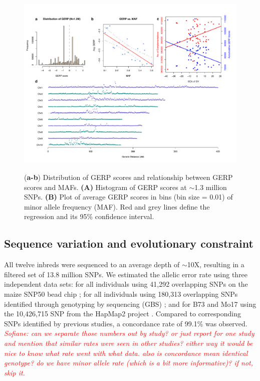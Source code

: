 \documentclass[twoside,twocolumn, letterpaper]{article}
\renewcommand{\baselinestretch}{1}
\newcommand{\jri}[1]{\textcolor{red}{ \emph{ #1}} }
\begin{document}
\begin{figure}[tbh]   
  \begin{center}
   \vspace{-2mm}
   \includegraphics[width=0.8\linewidth]{Fig2_gerp.pdf}
   \renewcommand{\baselinestretch}{0.9}
   \vspace{-3mm}
   \caption{({\bfseries a-b}) Distribution of GERP scores and relationship between GERP scores and MAFs. \textbf{(A)} Histogram of GERP scores at $\sim$1.3 million SNPs. \textbf{(B)} Plot of average GERP scores in bins (bin size = 0.01) of minor allele frequency (MAF). Red and grey lines define the regression and its 95\% confidence interval.} 
\vspace{-4mm}
    \label{fig:gerp}
  \end{center}
\end{figure}

\subsection*{Sequence variation and evolutionary constraint}

All twelve inbreds were sequenced to an average depth of $\sim$10X, resulting in a filtered set of 13.8 million SNPs. 
We estimated the allelic error rate using three independent data sets: for all individuals using 41,292 overlapping SNPs on the maize SNP50 bead chip \citep{Heerwaarden2012}; for all individuals using 180,313 overlapping SNPs identified through genotyping by sequencing (GBS) \citep{Romay2013}; and for B73 and Mo17 using the 10,426,715 SNP from the HapMap2 project \citep{Chia2012}.  Compared to corresponding SNPs identified by previous studies, a concordance rate of 99.1\% was observed. \jri{Sofiane: can we separate those numbers out by study? or just report for one study and mention that similar rates were seen in other studies? either way it would be nice to know what rate went with what data. also is concordance mean identical genotype? do we have minor allele rate (which is a bit more informative)? if not, skip it.} 
\end{document}
